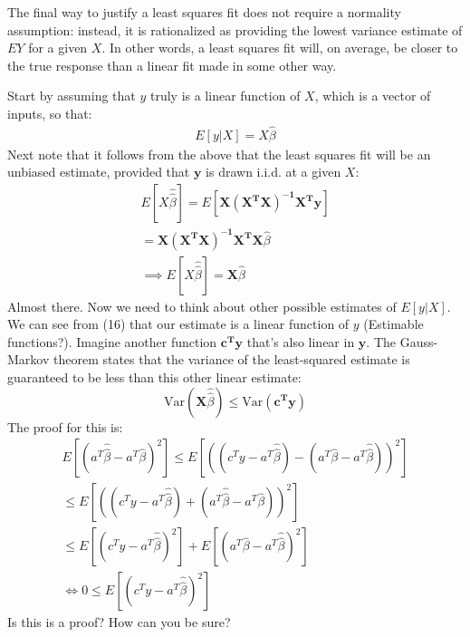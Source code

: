 \documentclass[11pt,a4paper,article]{memoir} %
\begin{document}
The final way to justify a least squares fit does not require a normality assumption: instead, it is rationalized as providing the lowest variance estimate of $EY$ for a given $X$. In other words, a least squares fit will, on average, be closer to the true response than a linear fit made in some other way.

Start by assuming that $y$ truly is a linear function of $X$, which is a vector of inputs, so that:
\begin{gather}
	E[y|X] = X\hat{\beta} 
\end{gather}
Next note that it follows from the above that the least squares fit will be an unbiased estimate, provided that $\boldsymbol{y}$ is drawn i.i.d. at a given $X$:
\begin{gather}
	E[X\hat{\hat{\beta}}] = E[\boldsymbol{X(X^T X)^{-1}X^T y}] \\
	= \boldsymbol{X(X^T X)^{-1}X^T X}\hat{\beta} \\
	\implies E[X\hat{\hat{\beta}}] = \boldsymbol{X}\hat{\beta}
\end{gather}
Almost there. Now we need to think about other possible estimates of $E[y|X]$. We can see from (16) that our estimate is a linear function of $y$ (Estimable functions?). Imagine another function $\boldsymbol{c^T y}$ that's also linear in $\boldsymbol{y}$. The Gauss-Markov theorem states that the variance of the least-squared estimate is guaranteed to be less than this other linear estimate:
\begin{equation}
	\text{Var}(\boldsymbol{X}\hat{\hat{\beta}}) \leq \text{Var}(\boldsymbol{c^Ty})
\end{equation} 
The proof for this is:
\begin{gather}
	E[(a^T \hat{\hat{\beta}} - a^T \hat{\beta})^2] \leq E[((c^T y - a^T \hat{\hat{\beta}}) - ( a^T \hat{\beta} - a^T \hat{\hat{\beta}}))^2]\\
	\leq  E[((c^T y - a^T \hat{\hat{\beta}}) + ( a^T \hat{\hat{\beta}} - a^T \hat{\beta}))^2] \\
	\leq E[(c^T y - a^T \hat{\hat{\beta}})^2] + E[( a^T \hat{\beta} - a^T \hat{\hat{\beta}})^2] \\
	\iff 0 \leq E[(c^T y - a^T \hat{\hat{\beta}})^2]
\end{gather}
Is this is a proof? How can you be sure?
\end{document}
